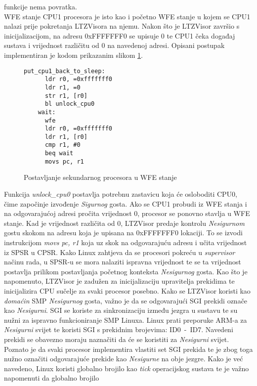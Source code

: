 \documentclass[times, utf8, diplomski, numeric]{fer}
\begin{document}
funkcije nema povratka.\\
WFE stanje CPU1 procesora je isto kao i početno WFE stanje u kojem se CPU1 nalazi prije pokretanja LTZVisora na njemu.
Nakon što je LTZVisor završio s inicijalizacijom, na adresu 0xFFFFFFF0 se upisuje 0 te CPU1 čeka događaj sustava i
vrijednost različitu od 0 na navedenoj adresi. Opisani postupak implementiran je kodom prikazanim slikom \ref{cpu1_wfe}.
\begin{figure}[H]
  \centering
  \lstset{numbers=left, numbersep=2pt, numberstyle=\tiny, breaklines=true, xleftmargin=.2\textwidth}
  \begin{lstlisting}[firstnumber=1]
    put_cpu1_back_to_sleep:
      ldr r0, =0xfffffff0
      ldr r1, =0
      str r1, [r0]
      bl unlock_cpu0
    wait:
      wfe
      ldr r0, =0xfffffff0
      ldr r1, [r0]
      cmp r1, #0
      beq wait
      movs pc, r1
  \end{lstlisting}
  \caption{Postavljanje sekundarnog procesora u WFE stanje}
  \label{cpu1_wfe}
\end{figure}
Funkcija \textit{unlock\_cpu0} postavlja potrebnu zastavicu koja će osloboditi CPU0, čime započinje izvođenje \textit{Sigurnog}
gosta. Ako se CPU1 probudi iz WFE stanja i na odgovarajućoj adresi pročita vrijednost 0, procesor se ponovno stavlja u WFE
stanje. Kad je vrijednost različita od 0, LTZVisor predaje kontrolu \textit{Nesigurnom} gostu skokom na adresu koja je upisana
na 0xFFFFFFF0 lokaciji. To se izvodi instrukcijom \textit{movs pc, r1} koja uz skok na odgovarajuću adresu i učita
vrijednost iz SPSR u CPSR. Kako Linux zahtjeva da se procesori pokreću u \textit{supervisor} načinu rada, u SPSR-u se mora
nalaziti ispravna vrijednost te se ta vrijednost postavlja prilikom postavljanja početnog konteksta \textit{Nesigurnog} gosta.
Kao što je napomenuto, LTZVisor je zadužen za inicijalizaciju upravitelja prekidima te inicijalizira CPU sučelje za svaki
procesor posebno. Kako se LTZVisor koristi kao \textit{domaćin} SMP \textit{Nesigurnog} gosta, važno je da se odgovarajući
SGI prekidi označe kao \textit{Nesigurni}. SGI se koriste za sinkronizaciju između jezgra u sustavu te su nužni za ispravno
funkcioniranje SMP Linuxa. Linux prati preporuke ARM-a za \textit{Nesigurni} svijet te koristi SGI s prekidnim brojevima: ID0~-~ID7. Navedeni prekidi
se obavezno moraju naznačiti da će se koristiti za \textit{Nesigurni} svijet. Poznato je da svaki procesor implementira
vlastiti set SGI prekida te je zbog toga nužno označiti odgovarajuće prekide kao \textit{Nesigurne} na obje jezgre. Kako je
već navedeno, Linux koristi globalno brojilo kao \textit{tick} operacijskog sustava te je važno napomenuti da globalno brojilo
\end{document}
